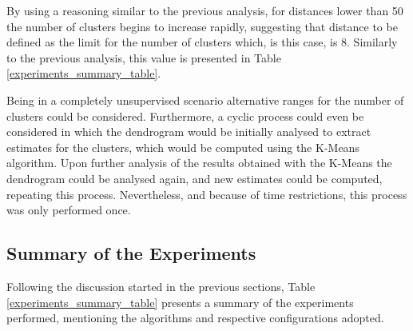 \documentclass[9pt,journal,compsoc]{IEEEtran}
\begin{document}
By using a reasoning similar to the previous analysis, for distances lower than 50 the number of clusters begins to increase rapidly, suggesting that distance to be defined as the limit for the number of clusters which, is this case, is 8. Similarly to the previous analysis, this value is presented in Table \ref{experiments_summary_table}.

Being in a completely unsupervised scenario alternative ranges for the number of clusters could be considered. Furthermore, a cyclic process could even be considered in which the dendrogram would be initially analysed to extract estimates for the clusters, which would be computed using the K-Means algorithm. Upon further analysis of the results obtained with the K-Means the dendrogram could be analysed again, and new estimates could be computed, repeating this process. Nevertheless, and because of time restrictions, this process was only performed once.

\subsection{Summary of the Experiments}
\label{experiments_summary}

Following the discussion started in the previous sections, Table \ref{experiments_summary_table} presents a summary of the experiments performed, mentioning the algorithms and respective configurations adopted.
\end{document}
